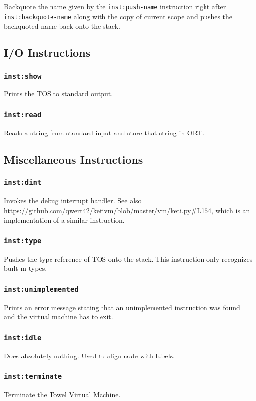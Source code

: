 \documentclass{article}
\newcommand{\inst}[1] {\texttt{inst:#1}}
\begin{document}
Backquote the name given by the \inst{push-name} instruction right after \inst{backquote-name} along with the copy of current scope and pushes the backquoted name back onto the stack.

\subsection{I/O Instructions}

\subsubsection{\inst{show}}

Prints the TOS to standard output.

\subsubsection{\inst{read}}

Reads a string from standard input and store that string in ORT.

\subsection{Miscellaneous Instructions}

\subsubsection{\inst{dint}}

Invokes the debug interrupt handler. See also \url{https://github.com/qwert42/ketivm/blob/master/vm/keti.py#L164}, which is an implementation of a similar instruction.

\subsubsection{\inst{type}}

Pushes the type reference of TOS onto the stack. This instruction only recognizes built-in types.

\subsubsection{\inst{unimplemented}}

Prints an error message stating that an unimplemented instruction was found and the virtual machine has to exit.

\subsubsection{\inst{idle}}

Does absolutely nothing. Used to align code with labels.

\subsubsection{\inst{terminate}}

Terminate the Towel Virtual Machine.
\end{document}
